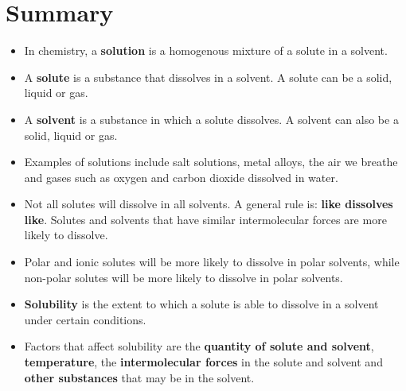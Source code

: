 \section{Summary}

\begin{itemize}
\item{In chemistry, a \textbf{solution} is a homogenous mixture of a solute in a solvent.}
\item{A \textbf{solute} is a substance that dissolves in a solvent. A solute can be a solid, liquid or gas.}
\item{A \textbf{solvent} is a substance in which a solute dissolves. A solvent can also be a solid, liquid or gas.}
\item{Examples of solutions include salt solutions, metal alloys, the air we breathe and gases such as oxygen and carbon dioxide dissolved in water.}
\item{Not all solutes will dissolve in all solvents. A general rule is: \textbf{like dissolves like}. Solutes and solvents that have similar intermolecular forces are more likely to dissolve.}
\item{Polar and ionic solutes will be more likely to dissolve in polar solvents, while non-polar solutes will be more likely to dissolve in polar solvents.}
\item{\textbf{Solubility} is the extent to which a solute is able to dissolve in a solvent under certain conditions.}
\item{Factors that affect solubility are the \textbf{quantity of solute and solvent}, \textbf{temperature}, the \textbf{intermolecular forces} in the solute and solvent and \textbf{other substances} that may be in the solvent.}
\end{itemize}


